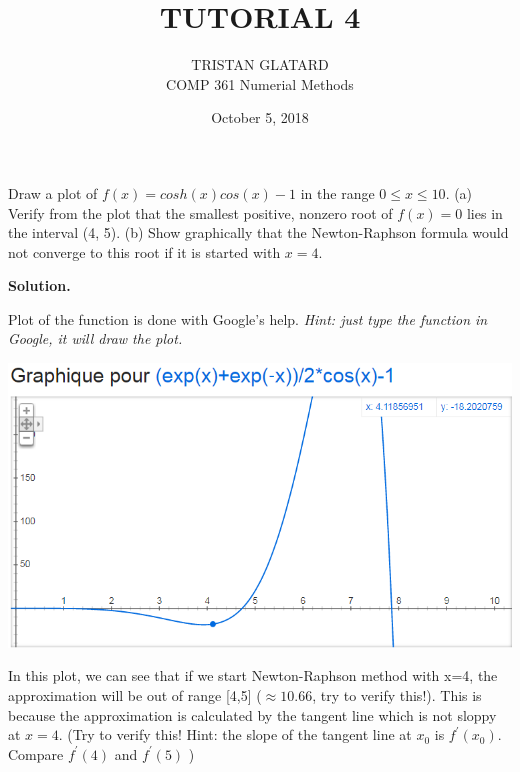  

 

\title{TUTORIAL 4}%
\author{TRISTAN GLATARD\\ %
COMP 361 Numerial Methods} %
\date{October 5, 2018} 
\maketitle

\begin{exercise}{1} %
Draw a plot of $f(x) = cosh(x)cos(x)-1$ in the range $0 \leq x \leq 10$. (a) Verify from the
plot that the smallest positive, nonzero root of $f(x)=0$ lies in the interval (4, 5).
(b) Show graphically that the Newton-Raphson formula would not converge to
this root if it is started with $x = 4$.

\textbf{Solution.} 

Plot of the function is done with Google's help. \textit{Hint: just type the function in Google, it will draw the plot.}

\includegraphics[]{coshxcosx-1.png}

In this plot, we can see that if we start Newton-Raphson method with x=4, the approximation will be out of range [4,5] ($\approx  10.66$, try to verify this!). This is because the approximation is calculated by the tangent line which is not sloppy at $x=4$. (Try to verify this! Hint: the slope of the tangent line at $x_0$ is  $f^\prime(x_0)$. Compare $f^\prime(4)$ and $f^\prime(5)$ )

\end{exercise}

